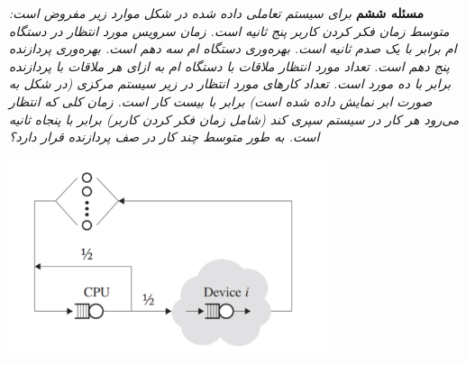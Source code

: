 \documentclass[12pt]{article}
\begin{document}
    \textbf{مسئله ششم}
	\newline
	\textit{برای سیستم تعاملی داده شده در شکل موارد زیر مفروض است:\newline
	متوسط زمان فکر کردن کاربر پنج ثانیه است. زمان سرویس مورد انتظار در دستگاه  ام برابر با یک صدم ثانیه است. بهره‌وری دستگاه ام سه دهم است. بهره‌وری پردازنده
پنج دهم است. تعداد مورد انتظار ملاقات با دستگاه  ام به ازای هر ملاقات با پردازنده برابر با ده مورد است. تعداد کارهای مورد انتظار در زیر سیستم مرکزی (در شکل به صورت ابر نمایش داده شده است) برابر با بیست کار است. زمان کلی که انتظار می‌رود هر کار در سیستم سپری کند (شامل زمان فکر کردن کاربر) برابر با پنجاه ثانیه است. به
طور متوسط چند کار در صف پردازنده قرار دارد؟}
	\begin{center}
	    \includegraphics[width=0.7\textwidth]{Content/figure-6.png}
	\end{center}
%		
%		
\end{document}
